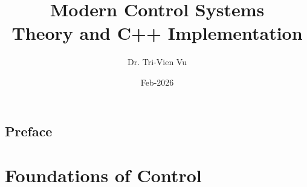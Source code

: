 \documentclass[11pt,twoside,openright]{book}
\begin{document}
	
	
	\frontmatter
	
	\title{\textbf{Modern Control Systems}\\[1ex]
	\large Theory and C++ Implementation}
	\author{Dr. Tri-Vien Vu}
	\date{Feb-2026}
	\maketitle
	
	\chapter*{Preface}
	
	\tableofcontents
	
	
	\mainmatter
	
	\part{Foundations of Control}
	
	
	
	
	
	\backmatter
	
	
	
	
\end{document}
